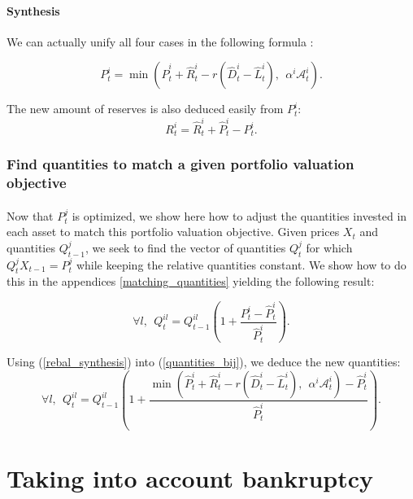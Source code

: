 \documentclass{article}
\newcommand{\wh}{\widehat}
\begin{document}
\paragraph{Synthesis}
We can actually unify all four cases in the following formula : 

\begin{equation}\label{rebal_synthesis}
P_t^i = \min(\widehat{P}_t^i + \widehat{R}_t^i - r(\wh D_t^i - \wh L_t^i),~~\alpha^i \mathcal{A}_t^i).
\end{equation}

The new amount of reserves is also deduced easily from $P_t^i$: 
\begin{equation}\label{eq:rebal_reserves}
R_t^i = \widehat{R}_t^i + \widehat{P}_t^i - P_t^i.
\end{equation}

\subsubsection{Find quantities to match a given portfolio valuation objective}

\paragraph{}
Now that $P_t^{j}$ is optimized, we show here how to adjust the quantities invested in each asset to match this portfolio valuation objective. Given prices $X_t$ and quantities $Q_{t-1}^j$, we seek to find the vector of quantities $Q_t^{j}$ for which $Q_t^{j}X_{t-1} = P_t^{j}$ while keeping the relative quantities constant. We show how to do this in the appendices \ref{matching_quantities} yielding the following result: 

\begin{equation}\label{quantities_bij}
\forall l,~~ Q_t^{il} = Q_{t-1}^{il}\left(1 + \frac{P_t^i - \widehat{P}_t^i}{\widehat{P}_t^i} \right).
\end{equation}



Using (\ref{rebal_synthesis}) into (\ref{quantities_bij}), we deduce the new quantities:
\begin{equation}\label{eq:rebal_quantities}
\forall l,~~ Q_t^{il} = Q_{t-1}^{il}\left(1 + \frac{\min(\widehat{P}_t^i + \widehat{R}_t^i - r(\wh D_t^i - \wh L_t^i),~~\alpha^i \mathcal{A}_t^i) - \widehat{P}_t^i}{\widehat{P}_t^i} \right).
\end{equation}


\section{Taking into account bankruptcy}\label{dynamic with bankruptcy}
\end{document}
